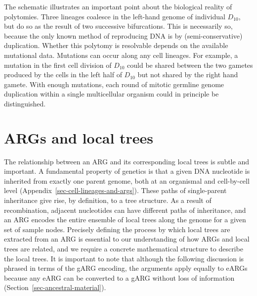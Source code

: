 \documentclass{article}
\begin{document}
The schematic illustrates an important point about the biological reality of polytomies.
Three lineages coalesce in the left-hand genome of individual $D_{10}$, but do
so as the result of two successive bifurcations. This is necessarily so,
because the only known method of reproducing DNA is by (semi-conservative) duplication.
Whether this polytomy is resolvable depends on the available mutational data.
Mutations can occur along any cell lineages. For example,
a mutation in the first cell division of $D_{10}$ could be shared between
the two gametes produced by the cells in the left half of $D_{10}$
but not shared by the right hand gamete.
With enough mutations, each
round of mitotic germline genome duplication within a single multicellular organism could
in principle be distinguished.

\section{ARGs and local trees}
\label{sec-ARG-and-local-trees}
The relationship between an ARG and its corresponding
local trees is subtle and important.
A fundamental property of genetics is that a
given DNA nucleotide is inherited from exactly one parent genome,
both at an organismal and cell-by-cell level
(Appendix~\ref{sec-cell-lineages-and-args}).
These paths of single-parent inheritance give rise,
by definition, to a tree structure.
As a result of recombination, adjacent nucleotides can have
different paths of inheritance, and
an ARG encodes the entire ensemble of local trees along the
genome for a given set of sample nodes.
Precisely defining the process by which local trees are extracted
from an ARG is essential to our understanding of how ARGs and local trees
are related, and we require a concrete mathematical structure
to describe the local trees. It is important to note that
although the following discussion is phrased in terms of the
gARG encoding,  the arguments apply equally to eARGs
because any eARG can be converted to a
gARG without loss of information (Section~\ref{sec-ancestral-material}).
\end{document}
